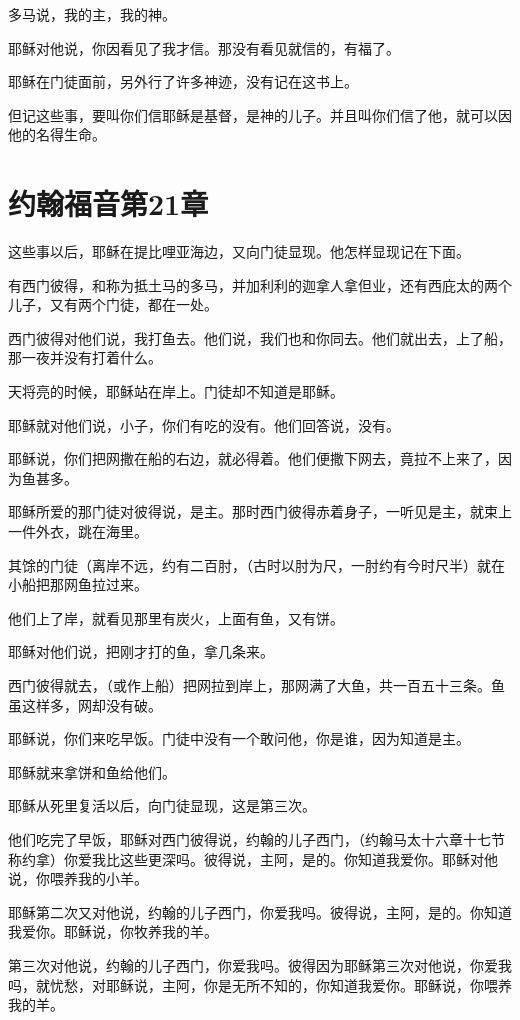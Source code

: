 \documentclass[12pt,oneside]{book}
\begin{document}
多马说，我的主，我的神。

耶稣对他说，你因看见了我才信。那没有看见就信的，有福了。

耶稣在门徒面前，另外行了许多神迹，没有记在这书上。

但记这些事，要叫你们信耶稣是基督，是神的儿子。并且叫你们信了他，就可以因他的名得生命。

\chapter{约翰福音第21章}
这些事以后，耶稣在提比哩亚海边，又向门徒显现。他怎样显现记在下面。

有西门彼得，和称为抵土马的多马，并加利利的迦拿人拿但业，还有西庇太的两个儿子，又有两个门徒，都在一处。

西门彼得对他们说，我打鱼去。他们说，我们也和你同去。他们就出去，上了船，那一夜并没有打着什么。

天将亮的时候，耶稣站在岸上。门徒却不知道是耶稣。

耶稣就对他们说，小子，你们有吃的没有。他们回答说，没有。

耶稣说，你们把网撒在船的右边，就必得着。他们便撒下网去，竟拉不上来了，因为鱼甚多。

耶稣所爱的那门徒对彼得说，是主。那时西门彼得赤着身子，一听见是主，就束上一件外衣，跳在海里。

其馀的门徒（离岸不远，约有二百肘，（古时以肘为尺，一肘约有今时尺半）就在小船把那网鱼拉过来。

他们上了岸，就看见那里有炭火，上面有鱼，又有饼。

耶稣对他们说，把刚才打的鱼，拿几条来。

西门彼得就去，（或作上船）把网拉到岸上，那网满了大鱼，共一百五十三条。鱼虽这样多，网却没有破。

耶稣说，你们来吃早饭。门徒中没有一个敢问他，你是谁，因为知道是主。

耶稣就来拿饼和鱼给他们。

耶稣从死里复活以后，向门徒显现，这是第三次。

他们吃完了早饭，耶稣对西门彼得说，约翰的儿子西门，（约翰马太十六章十七节称约拿）你爱我比这些更深吗。彼得说，主阿，是的。你知道我爱你。耶稣对他说，你喂养我的小羊。

耶稣第二次又对他说，约翰的儿子西门，你爱我吗。彼得说，主阿，是的。你知道我爱你。耶稣说，你牧养我的羊。

第三次对他说，约翰的儿子西门，你爱我吗。彼得因为耶稣第三次对他说，你爱我吗，就忧愁，对耶稣说，主阿，你是无所不知的，你知道我爱你。耶稣说，你喂养我的羊。
\end{document}
